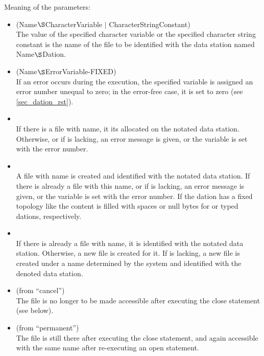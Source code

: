 Meaning of the parameters:
\begin{itemize}
\item {} (Name$\S $CharacterVariable $\mid$ CharacterStringConstant)
\\
The value of the specified character variable or the specified character
string constant is the name of the file to be identified with the data
station named Name$\S $Dation.
\item {} (Name$\S $ErrorVariable-FIXED)
\\
If an error occurs during the  execution, the specified variable is
assigned an error number unequal to zero; in the error-free case, it is
set to zero (see \ref{sec_dation_rst}).
\item {}\\
If there is a file with  name, it its allocated on the notated data
station. Otherwise, or if  is lacking, an error message is given, or
the  variable is set with the error number.
\item {}\\
A file with  name is created and identified with the notated data
station. If there is already a file with this name, or if  is
lacking, an error message is given, or the  variable is set with the
error number.
If the dation has a fixed topology like  the content is
filled with spaces or null bytes for  or typed dations, respectively.
\item {}\\
If there is already a file with  name, it is identified with the
notated data station. Otherwise, a new file is created for it. If 
is lacking, a new file is created under a name determined by the system
and identified with the denoted data station.
\item {} (from ``cancel'')\\
The file is no longer to be made accessible after executing the close
statement (see below).
\item {} (from ``permanent'')\\
The file is still there after executing the close statement, and again
accessible with the same name after re-executing an open statement.
\end{itemize}


